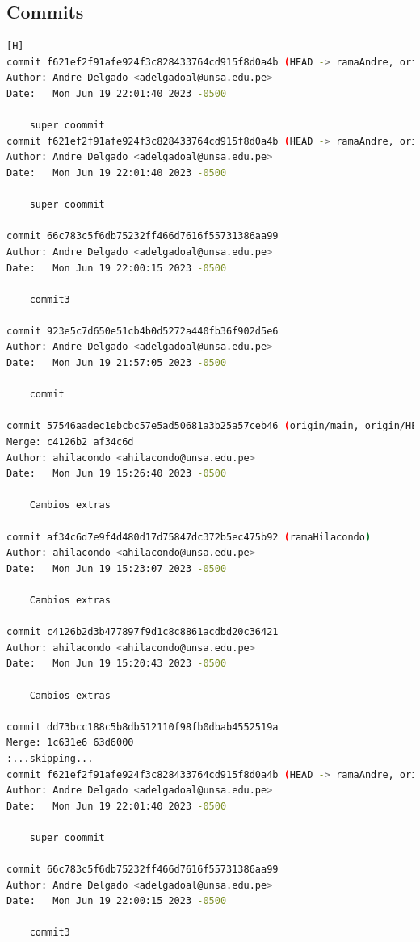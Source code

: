 \documentclass{article}
\begin{document}
	\subsection{Commits}
	\begin{lstlisting}[language=bash,caption={Commits del laboratorio}][H]
commit f621ef2f91afe924f3c828433764cd915f8d0a4b (HEAD -> ramaAndre, origin/ramaAndre)
Author: Andre Delgado <adelgadoal@unsa.edu.pe>
Date:   Mon Jun 19 22:01:40 2023 -0500

    super coommit
commit f621ef2f91afe924f3c828433764cd915f8d0a4b (HEAD -> ramaAndre, origin/ramaAndre)
Author: Andre Delgado <adelgadoal@unsa.edu.pe>
Date:   Mon Jun 19 22:01:40 2023 -0500

    super coommit

commit 66c783c5f6db75232ff466d7616f55731386aa99
Author: Andre Delgado <adelgadoal@unsa.edu.pe>
Date:   Mon Jun 19 22:00:15 2023 -0500

    commit3

commit 923e5c7d650e51cb4b0d5272a440fb36f902d5e6
Author: Andre Delgado <adelgadoal@unsa.edu.pe>
Date:   Mon Jun 19 21:57:05 2023 -0500

    commit

commit 57546aadec1ebcbc57e5ad50681a3b25a57ceb46 (origin/main, origin/HEAD, main)
Merge: c4126b2 af34c6d
Author: ahilacondo <ahilacondo@unsa.edu.pe>
Date:   Mon Jun 19 15:26:40 2023 -0500

    Cambios extras

commit af34c6d7e9f4d480d17d75847dc372b5ec475b92 (ramaHilacondo)
Author: ahilacondo <ahilacondo@unsa.edu.pe>
Date:   Mon Jun 19 15:23:07 2023 -0500

    Cambios extras

commit c4126b2d3b477897f9d1c8c8861acdbd20c36421
Author: ahilacondo <ahilacondo@unsa.edu.pe>
Date:   Mon Jun 19 15:20:43 2023 -0500

    Cambios extras

commit dd73bcc188c5b8db512110f98fb0dbab4552519a
Merge: 1c631e6 63d6000
:...skipping...
commit f621ef2f91afe924f3c828433764cd915f8d0a4b (HEAD -> ramaAndre, origin/ramaAndre)
Author: Andre Delgado <adelgadoal@unsa.edu.pe>
Date:   Mon Jun 19 22:01:40 2023 -0500

    super coommit

commit 66c783c5f6db75232ff466d7616f55731386aa99
Author: Andre Delgado <adelgadoal@unsa.edu.pe>
Date:   Mon Jun 19 22:00:15 2023 -0500

    commit3


\end{lstlisting}
\end{document}
